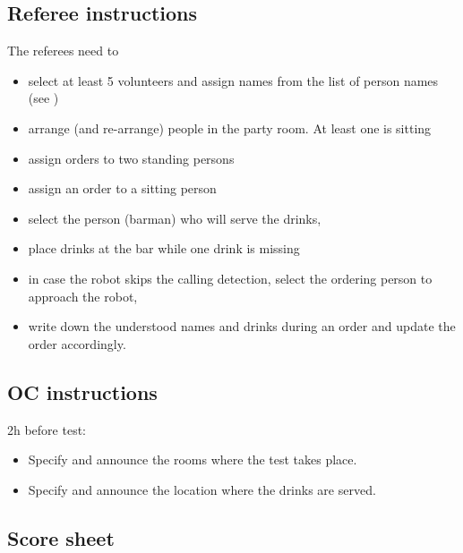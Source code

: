 \subsection{Referee instructions}

The referees need to
\begin{itemize}
	\item select at least 5 volunteers and assign names from the list of person names (see )
	\item arrange (and re-arrange) people in the party room. At least one is sitting
	\item assign orders to two standing persons
	\item assign an order to a sitting person
	\item select the person (barman) who will serve the drinks,
	\item place drinks at the bar while one drink is missing
	\item in case the robot skips the calling detection, select the ordering person to approach the robot,
	\item write down the understood names and drinks during an order and update the order accordingly.
\end{itemize}

\subsection{OC instructions}

2h before test:
\begin{itemize}
	\item Specify and announce the rooms where the test takes place.
	\item Specify and announce the location where the drinks are served.
\end{itemize}

\newpage
\subsection{Score sheet}

